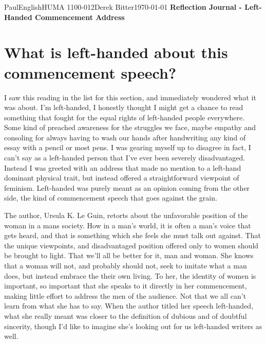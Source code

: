 \documentclass[12pt,letterpaper]{article}
\begin{document}
\begin{mla}{Paul}{English}{HUMA 1100-012}{Derek
    Bitter}{\today}    
    {\textbf{Reflection Journal - Left-Handed Commencement Address}}

\section*{What is left-handed about this commencement speech?}

I saw this reading in the list for this section, and immediately wondered what it was about. I'm left-handed, I honestly thought I might get a chance to read something that fought for the equal rights of left-handed people everywhere. Some kind of preached awareness for the struggles we face, maybe empathy and consoling for always having to wash our hands after handwriting any kind of essay with a pencil or most pens. I was gearing myself up to disagree in fact, I can't say as a left-handed person that I've ever been severely disadvantaged. Instead I was greeted with an address that made no mention to a left-hand dominant physical trait, but instead offered a straightforward viewpoint of feminism. Left-handed was purely meant as an opinion coming from the other side, the kind of commencement speech that goes against the grain.

The author, Ursula K. Le Guin, retorts about the unfavorable position of the woman in a mans society. How in a man's world, it is often a man's voice that gets heard, and that is something which she feels she must talk out against. That the unique viewpoints, and disadvantaged position offered only to women should be brought to light. That we'll all be better for it, man and woman. She knows that a woman will not, and probably should not, seek to imitate what a man does, but instead embrace the their own living. To her, the identity of women is important, so important that she speaks to it directly in her commencement, making little effort to address the men of the audience. Not that we all can't learn from what she has to say. When the author titled her speech left-handed, what she really meant was closer to the definition of dubious and of doubtful sincerity, though I'd like to imagine she's looking out for us left-handed writers as well.


\end{mla}
\end{document}
